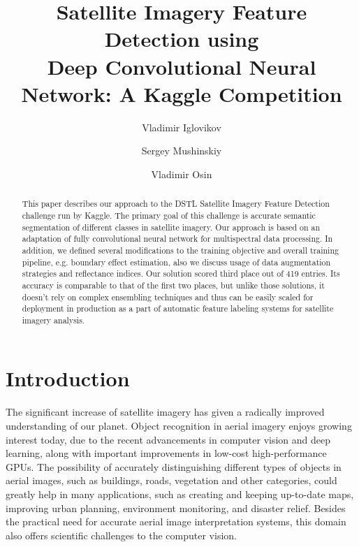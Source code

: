 \documentclass[10pt,twocolumn,letterpaper]{article}
\begin{document}
\title{Satellite Imagery Feature Detection using \\ Deep Convolutional Neural Network: A Kaggle Competition}

\author{Vladimir Iglovikov}

\author{Sergey Mushinskiy}

\author{Vladimir Osin}

\renewcommand\Authands{ and }

\maketitle

\begin{abstract}
This paper describes our approach to the DSTL Satellite Imagery Feature Detection challenge run by Kaggle. The primary goal of this challenge is accurate semantic segmentation of different classes in satellite imagery. Our approach is based on an adaptation of fully convolutional neural network for multispectral data processing.  In addition, we defined several modifications to the training objective and overall training pipeline, e.g. boundary effect estimation, also we discuss usage of data augmentation strategies and reflectance indices. Our solution scored third place out of 419 entries. Its accuracy is comparable to that of the first two places, but unlike those solutions, it doesn't rely on complex ensembling techniques and thus can be easily scaled for deployment in production as a part of automatic feature labeling systems for satellite imagery analysis.
\end{abstract}

\section{Introduction}
The significant increase of satellite imagery has given a radically improved understanding of our planet. Object recognition in aerial imagery enjoys growing interest today, due to the recent advancements in computer vision and deep learning, along with important improvements in low-cost high-performance GPUs. The possibility of accurately distinguishing different types of objects in aerial images, such as buildings, roads, vegetation and other categories, could greatly help in many applications, such as creating and keeping up-to-date maps, improving urban planning, environment monitoring, and disaster relief. Besides the practical need for accurate aerial image interpretation systems, this domain also offers scientific challenges to the computer vision.
\end{document}
